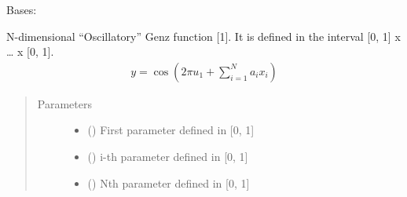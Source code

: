 \documentclass[letterpaper,10pt,english,openany,oneside]{sphinxmanual}
\begin{document}
\begin{fulllineitems}
\label{\detokenize{pygpc.testfunctions:pygpc.testfunctions.testfunctions.GenzOscillatory}}
Bases: {\hyperref[\detokenize{pygpc:pygpc.AbstractModel.AbstractModel}]{}}

N-dimensional “Oscillatory” Genz function {[}1{]}. It is defined in the interval {[}0, 1{]} x … x {[}0, 1{]}.
\begin{equation*}
\begin{split}y = \cos \left( 2 \pi u_1 + \sum_{i=1}^{N}a_i x_i \right)\end{split}
\end{equation*}\begin{quote}\begin{description}
\item[{Parameters}] \leavevmode\begin{itemize}
\item {} 
\sphinxstyleliteralstrong{\sphinxupquote{{[}}}\sphinxstyleliteralstrong{\sphinxupquote{{]}}} (\sphinxstyleliteralemphasis{\sphinxupquote{ {[}}}\sphinxstyleliteralemphasis{\sphinxupquote{{]}}}) \textendash{} First parameter defined in {[}0, 1{]}

\item {} 
\sphinxstyleliteralstrong{\sphinxupquote{{[}}}\sphinxstyleliteralstrong{\sphinxupquote{{]}}} (\sphinxstyleliteralemphasis{\sphinxupquote{ {[}}}\sphinxstyleliteralemphasis{\sphinxupquote{{]}}}) \textendash{} i-th parameter defined in {[}0, 1{]}

\item {} 
\sphinxstyleliteralstrong{\sphinxupquote{{[}}}\sphinxstyleliteralstrong{\sphinxupquote{{]}}} (\sphinxstyleliteralemphasis{\sphinxupquote{ {[}}}\sphinxstyleliteralemphasis{\sphinxupquote{{]}}}) \textendash{} Nth parameter defined in {[}0, 1{]}


\end{itemize}
\end{description}
\end{quote}
\end{fulllineitems}
\end{document}
